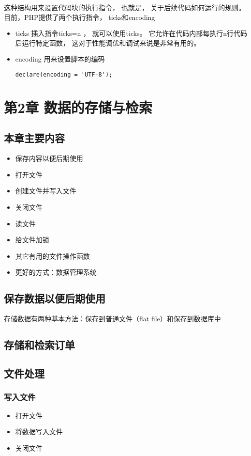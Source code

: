 \documentclass[11pt]{article}
\begin{document}
这种结构用来设置代码块的执行指令， 也就是， 关于后续代码如何运行的规则。 目前，PHP提供了两个执行指令， ticks和encoding
\begin{itemize}
\item ticks
插入指令ticks=n ， 就可以使用ticks。 它允许在代码内部每执行n行代码后运行特定函数， 这对于性能调优和调试来说是非常有用的。
\item encoding 用来设置脚本的编码
\begin{verbatim}
declare(encoding = 'UTF-8');
\end{verbatim}
\end{itemize}
\section{第2章 数据的存储与检索}
\label{sec:org42e66ef}
\subsection{本章主要内容}
\label{sec:orgd4126c7}

\begin{itemize}
\item 保存内容以便后期使用
\item 打开文件
\item 创建文件并写入文件
\item 关闭文件
\item 读文件
\item 给文件加锁
\item 其它有用的文件操作函数
\item 更好的方式：数据管理系统
\end{itemize}

\subsection{保存数据以便后期使用}
\label{sec:org4a99528}
存储数据有两种基本方法：保存到普通文件（flat file）和保存到数据库中
\subsection{存储和检索订单}
\label{sec:org878e1ff}
\subsection{文件处理}
\label{sec:org9595b54}
\subsubsection{写入文件}
\label{sec:org94d0502}
\begin{itemize}
\item 打开文件
\item 将数据写入文件
\item 关闭文件
\end{itemize}
\end{document}
